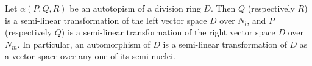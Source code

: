 Let $\alpha(P, Q, R)$ be an autotopism of a division ring $D$. Then $Q$ (respectively $R$) is a semi-linear transformation of the left vector space $D$ over $N_l$, and $P$ (respectively $Q$) is a semi-linear transformation of the right vector space $D$ over $N_m$. In particular, an automorphism of $D$ is a semi-linear transformation of $D$ as a vector space over any one of its semi-nuclei.
